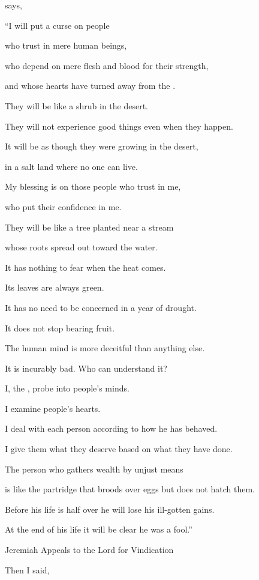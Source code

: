 {{}
says,
\par }{\Q “I
will put
a curse
on people
\par }{\Q who trust in mere human
beings,
\par }{\Q who depend
on mere
flesh
and blood for their strength,
\par }{\Q and whose hearts
have turned
away from
the {}.
\par }{\Q {}They will be
like a shrub
in the desert.
\par }{\Q They will not
experience
good things
even when they happen.
\par }{\Q It will be as though they were growing
in the desert,
\par }{\Q in a salt
land
where no one
can live.
\par }{\Q {}My blessing
is on those
people
who trust
in me,
\par }{\Q who put their confidence in me.
\par }{\Q {}They will be
like a tree
planted
near
a stream
\par }{\Q whose roots
spread out
toward
the water.
\par }{\Q It has nothing
to fear
when
the heat
comes.
\par }{\Q Its leaves
are always green.
\par }{\Q It has no
need to be concerned
in a year
of drought.
\par }{\Q It does not
stop
bearing
fruit.
\par }{\Q {}The human mind
is more deceitful
than anything else.
\par }{\Q It is incurably
bad. Who
can understand it?
\par }{\Q {}I,
the {}, probe
into people’s minds.
\par }{\Q I examine
people’s hearts.
\par }{\Q I deal with each person
according to how he has behaved.
\par }{\Q I give
them what they deserve
based on what they have done.
\par }{\Q {}The person who gathers
wealth
by unjust
means
\par }{\Q is like the partridge
that broods over eggs
but does not
hatch
them.

\par }{\Q Before his life
is half
over he will lose
his ill-gotten gains.

\par }{\Q At the end
of his life it will be
clear he was a fool.”
\par }{\SH Jeremiah Appeals to the Lord for Vindication
\par }{\PP {}Then I said,

}
